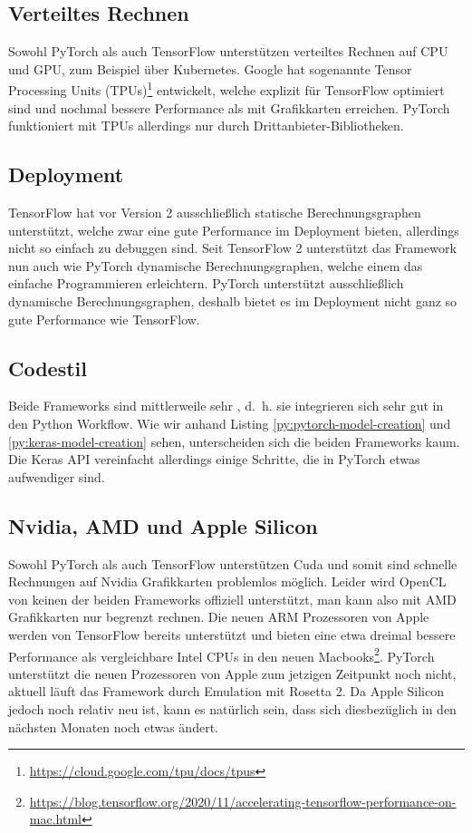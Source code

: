 \subsection{Verteiltes Rechnen}
Sowohl PyTorch als auch TensorFlow unterstützen verteiltes Rechnen auf CPU und GPU, zum Beispiel über Kubernetes. 
Google hat sogenannte Tensor Processing Units (TPUs)\footnote{\url{https://cloud.google.com/tpu/docs/tpus}} entwickelt, 
welche explizit für TensorFlow optimiert sind und nochmal bessere Performance als mit Grafikkarten erreichen. 
PyTorch funktioniert mit TPUs allerdings nur durch Drittanbieter-Bibliotheken. 

\subsection{Deployment}
TensorFlow hat vor Version 2 ausschließlich statische Berechnungsgraphen unterstützt, welche zwar eine gute Performance im Deployment bieten, 
allerdings nicht so einfach zu debuggen sind. Seit TensorFlow 2 unterstützt das Framework nun auch wie PyTorch dynamische Berechnungsgraphen, 
welche einem das einfache Programmieren erleichtern. PyTorch unterstützt ausschließlich dynamische Berechnungsgraphen, deshalb bietet es im 
Deployment nicht ganz so gute Performance wie TensorFlow. 

\subsection{Codestil}
Beide Frameworks sind mittlerweile sehr , d.~h. sie integrieren sich sehr gut in den Python Workflow. 
Wie wir anhand Listing \ref{py:pytorch-model-creation} und \ref{py:keras-model-creation} sehen, unterscheiden sich die beiden Frameworks kaum. 
Die Keras API vereinfacht allerdings einige Schritte, die in PyTorch etwas aufwendiger sind. 

\subsection{Nvidia, AMD und Apple Silicon}
Sowohl PyTorch als auch TensorFlow unterstützen Cuda und somit sind schnelle Rechnungen auf Nvidia Grafikkarten problemlos möglich. 
Leider wird OpenCL von keinen der beiden Frameworks offiziell unterstützt, man kann also mit AMD Grafikkarten nur begrenzt rechnen.
Die neuen ARM Prozessoren von Apple werden von TensorFlow bereits unterstützt und bieten eine etwa dreimal bessere Performance als 
vergleichbare Intel CPUs in den neuen Macbooks\footnote{\url{https://blog.tensorflow.org/2020/11/accelerating-tensorflow-performance-on-mac.html}}.
PyTorch unterstützt die neuen Prozessoren von Apple zum jetzigen Zeitpunkt noch nicht, aktuell läuft das Framework durch Emulation mit Rosetta 2.
Da Apple Silicon jedoch noch relativ neu ist, kann es natürlich sein, dass sich diesbezüglich in den nächsten Monaten noch etwas ändert.

